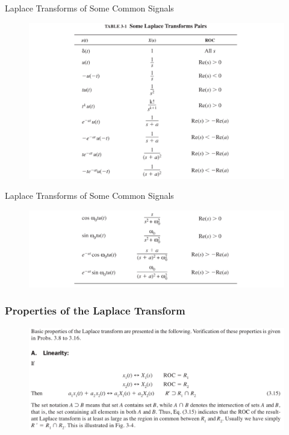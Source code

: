\documentclass[pdflatex,compress,mathserif]{beamer}
\begin{document}
\begin{frame}{Laplace Transforms of Some Common Signals}
	\begin{figure}
		\centering
		\includegraphics[width=\linewidth]{img/img14}
	\end{figure}
\end{frame}

\begin{frame}{Laplace Transforms of Some Common Signals}
	\begin{figure}
		\centering
		\includegraphics[width=\linewidth]{img/img15}
	\end{figure}
\end{frame}

\begin{frame}
	\frametitle{Properties of the Laplace Transform}
	\begin{figure}
		\centering
		\includegraphics[width=\linewidth]{img/img16}
	\end{figure}
\end{frame}
\end{document}
